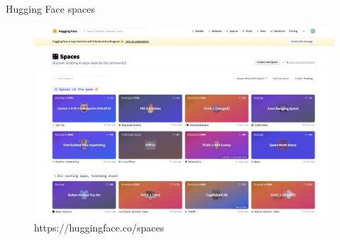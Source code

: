 \documentclass{beamer}
\begin{document}
\begin{frame}{Hugging Face spaces}
    \begin{figure}
        \centering
        \includegraphics[width=1\textwidth,keepaspectratio]{images/hf_spaces}
        \caption{https://huggingface.co/spaces}
        \label{fig:hf_spaces}
    \end{figure}
\end{frame}
\end{document}
